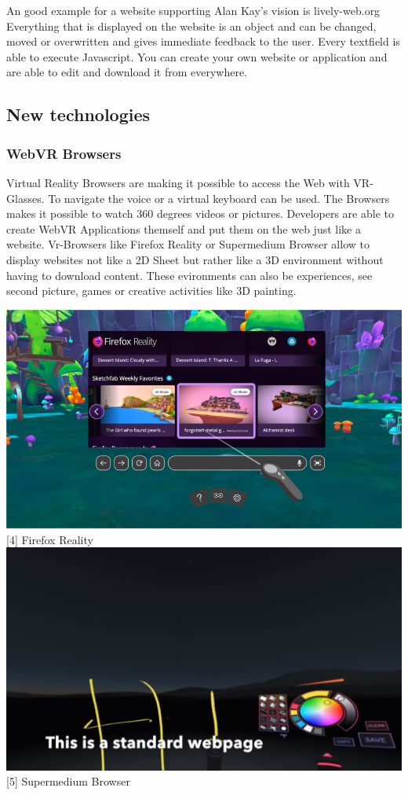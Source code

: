 \documentclass[runningheads]{llncs}
\begin{document}
		An good example for a website supporting Alan Kay's vision is lively-web.org
		Everything that is displayed on the website is an object and can be changed, moved or overwritten and gives immediate feedback to the user. Every textfield is able to execute Javascript. You can create your own website or application and are able to edit and download it from everywhere.
		\subsection{New technologies}
			\subsubsection{WebVR Browsers}
				Virtual Reality Browsers are making it possible to access the Web with VR-Glasses. To navigate the voice or a virtual keyboard can be used. The Browsers makes it possible to watch 360 degrees videos or pictures. Developers are able to create WebVR Applications themself and put them on the web just like a website. Vr-Browsers like Firefox Reality or Supermedium Browser allow to display websites not like a 2D Sheet but rather like a 3D environment without having to download content. These evironments can also be experiences, see second picture, games or creative activities like 3D painting.
			\begin{center}
				\includegraphics[scale=0.35]{Firefox_Reality.png}
				[4]	Firefox Reality
				\includegraphics[scale=0.35]{Supermedium.png}
				[5] Supermedium Browser
			\end{center}
\end{document}
